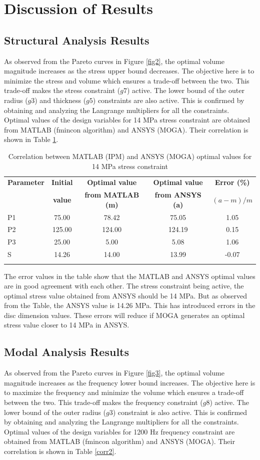 \documentclass[12pt]{article}
\begin{document}
\section{Discussion of Results}
\subsection{Structural Analysis Results}
As observed from the Pareto curves in Figure \ref{fig2}, the optimal volume magnitude increases as the stress upper bound decreases. The objective here is to minimize the stress and volume which ensures a trade-off between the two. This trade-off makes the stress constraint ($g7$) active. The lower bound of the outer radius ($g3$) and thickness ($g5$) constraints are also active. This is confirmed by obtaining and analyzing the Langrange multipliers for all the constraints. Optimal values of the design variables for 14 MPa stress constraint are obtained from MATLAB (fmincon algorithm) and ANSYS (MOGA). Their correlation is shown in Table \ref{corr1}.

\begin{longtable}{|l|c|c|c|c|}
\hline 
\textbf{Parameter} & \textbf{Initial} & \textbf{Optimal value} & \textbf{Optimal value} & \textbf{Error (\%)} \\
 & \textbf{value} & \textbf{from MATLAB (m)} & \textbf{from ANSYS (a)} & \textbf{$(a-m)/m$}\\
\hline
P1 & 75.00 & 78.42 & 75.05 & 1.05 \\
\hline
P2 & 125.00 & 124.00 & 124.19 & 0.15 \\
\hline
P3 & 25.00 & 5.00 & 5.08 & 1.06\\
\hline
S & 14.26 & 14.00 & 13.99 & -0.07 \\
\hline
\caption{Correlation between MATLAB (IPM) and ANSYS (MOGA) optimal values for 14 MPa stress constraint}
\label{corr1}
\end{longtable}
The error values in the table show that the MATLAB and ANSYS optimal values are in good agreement with each other. The stress constraint being active, the optimal stress value obtained from ANSYS should be 14 MPa. But as observed from the Table, the ANSYS value is 14.26 MPa. This has introduced errors in the disc dimension values. These errors will reduce if MOGA generates an optimal stress value closer to 14 MPa in ANSYS.

\subsection{Modal Analysis Results}
As observed from the Pareto curves in Figure \ref{fig3}, the optimal volume magnitude increases as the frequency lower bound increases. The objective here is to maximize the frequency and minimize the volume which ensures a trade-off between the two. This trade-off makes the frequency constraint ($g8$) active. The lower bound of the outer radius ($g3$) constraint is also active. This is confirmed by obtaining and analyzing the Langrange multipliers for all the constraints. Optimal values of the design variables for 1200 Hz frequency constraint are obtained from MATLAB (fmincon algorithm) and ANSYS (MOGA). Their correlation is shown in Table \ref{corr2}.
\end{document}
